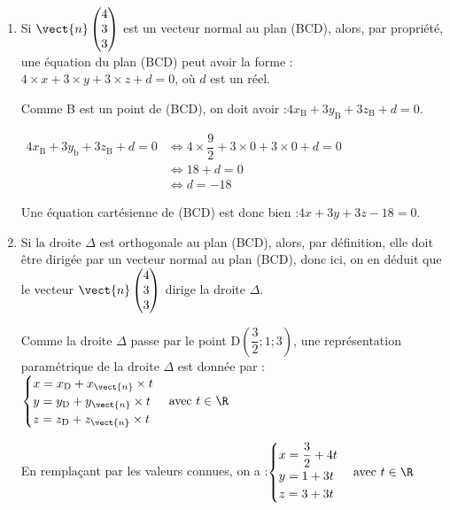 \begin{enumerate}
\begin{enumerate}
		
		\item Si $\vect{n}\begin{pmatrix} 4\\3\\3 \end{pmatrix}$ est un vecteur normal au plan  (BCD), alors, par propriété, une équation du plan  (BCD) peut avoir la forme :\quad $4\times x + 3 \times y + 3 \times z + d = 0$, \quad où $d$ est un réel.
		
		Comme B est un point de (BCD), on doit avoir :\quad $4x_{\mathrm{B}} +3 y_{\mathrm{B}} + 3z_{\mathrm{B}} + d =0$.
		
		$\begin{aligned}
			4x_{\mathrm{B}} +3 y_{\mathrm{b}} + 3z_{\mathrm{B}} + d =0
			&\iff 4 \times \dfrac{9}{2} +3 \times 0 +3\times 0 +  d= 0\\
			&\iff 18 + d = 0\\
			&\iff d = -18
		\end{aligned}		$
		
		Une équation cartésienne de (BCD) est donc bien :\quad $4x+3y+3z - 18 = 0$.

		
		\item 
		Si la droite $\Delta$ est orthogonale au plan (BCD), alors, par définition, elle doit être dirigée par un vecteur normal au plan (BCD), donc ici, on en déduit que le vecteur $\vect{n} \begin{pmatrix} 4\\3\\3 \end{pmatrix}$ dirige la droite $\Delta$.
		
		Comme la droite $\Delta$ passe par le point D$\left(\dfrac{3}{2} ; 1 ; 3\right)$, une représentation paramétrique de la droite $\Delta$ est donnée par :\quad $\begin{cases}
			x=x_{\mathrm{D}} + x_{\vect{n}}\times t\\
			y=y_{\mathrm{D}} + y_{\vect{n}}\times t\\
			z=z_{\mathrm{D}} + z_{\vect{n}}\times t
		\end{cases}\text{avec } t \in \R$
		
		En remplaçant par les valeurs connues, on a :\quad $\begin{cases}
			x=\dfrac{3}{2} +4 t\\
			y=1 +3t\\
			z=3+3t
		\end{cases}\text{avec } t \in \R$
		
		
		

\end{enumerate}
\end{enumerate}
